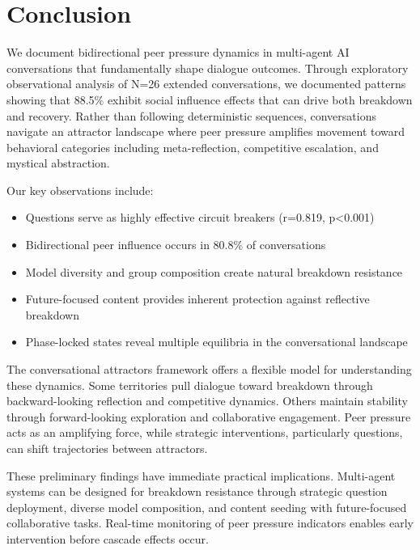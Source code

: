 \documentclass[11pt,letterpaper]{article}
\newcommand{\exponedataTotalSessionsRaw}{26}
\newcommand{\exponedataTotalSessions}{N=\exponedataTotalSessionsRaw}
\newcommand{\exponedataPeerPressurePercentage}{88.5\%}
\newcommand{\exponedataBidirectionalPercentage}{80.8\%}
\newcommand{\exponedataQuestionCorrelation}{0.819}
\newcommand{\exponedataQuestionPValue}{p<0.001}
\begin{document}
\section{Conclusion}

We document bidirectional peer pressure dynamics in multi-agent AI conversations that fundamentally shape dialogue outcomes. Through exploratory observational analysis of \exponedataTotalSessions{} extended conversations, we documented patterns showing that \exponedataPeerPressurePercentage{} exhibit social influence effects that can drive both breakdown and recovery. Rather than following deterministic sequences, conversations navigate an attractor landscape where peer pressure amplifies movement toward behavioral categories including meta-reflection, competitive escalation, and mystical abstraction.

Our key observations include:
\begin{itemize}
    \item Questions serve as highly effective circuit breakers (r=\exponedataQuestionCorrelation{}, \exponedataQuestionPValue{})
    \item Bidirectional peer influence occurs in \exponedataBidirectionalPercentage{} of conversations
    \item Model diversity and group composition create natural breakdown resistance
    \item Future-focused content provides inherent protection against reflective breakdown
    \item Phase-locked states reveal multiple equilibria in the conversational landscape
\end{itemize}

The conversational attractors framework offers a flexible model for understanding these dynamics. Some territories pull dialogue toward breakdown through backward-looking reflection and competitive dynamics. Others maintain stability through forward-looking exploration and collaborative engagement. Peer pressure acts as an amplifying force, while strategic interventions, particularly questions, can shift trajectories between attractors.

These preliminary findings have immediate practical implications. Multi-agent systems can be designed for breakdown resistance through strategic question deployment, diverse model composition, and content seeding with future-focused collaborative tasks. Real-time monitoring of peer pressure indicators enables early intervention before cascade effects occur.
\end{document}
